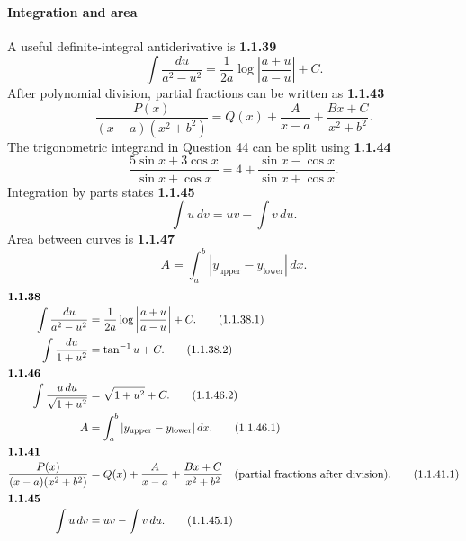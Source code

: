 \paragraph*{Integration and area}
A useful definite-integral antiderivative is
\noindent\textbf{1.1.39}\quad
\begin{equation}
\int\frac{du}{a^2-u^2}=\frac1{2a}\log\left|\frac{a+u}{a-u}\right|+C.\tag{1.1.39.1}\label{eq:int-rational-39}
\end{equation}
After polynomial division, partial fractions can be written as
\noindent\textbf{1.1.43}\quad
\begin{equation}
\frac{P(x)}{(x-a)(x^2+b^2)}=Q(x)+\frac{A}{x-a}+\frac{Bx+C}{x^2+b^2}.\tag{1.1.43.1}\label{eq:partial-fractions-43}
\end{equation}
The trigonometric integrand in Question 44 can be split using
\noindent\textbf{1.1.44}\quad
\begin{equation}
\frac{5\sin x+3\cos x}{\sin x+\cos x}=4+\frac{\sin x-\cos x}{\sin x+\cos x}.\tag{1.1.44.1}\label{eq:trig-split-44}
\end{equation}
Integration by parts states
\noindent\textbf{1.1.45}\quad
\begin{equation}
\int u\,dv=uv-\int v\,du.\tag{1.1.45.2}\label{eq:parts-45-2}
\end{equation}
Area between curves is
\noindent\textbf{1.1.47}\quad
\begin{equation}
A=\int_a^b|y_{\mathrm{upper}}-y_{\mathrm{lower}}|\,dx.\tag{1.1.47.1}\label{eq:area-between-47}
\end{equation}
\begin{align}\intertext{\textbf{1.1.38}}
\int\frac{du}{a^2-u^2}&=\frac1{2a}\log\left|\frac{a+u}{a-u}\right|+C. \tag{1.1.38.1}\label{eq:rational-integral-38}\\
\int\frac{du}{1+u^2}&=\tan^{-1}u+C. \tag{1.1.38.2}\label{eq:arctan-integral-38}\\
\intertext{\textbf{1.1.46}}
\int\frac{u\,du}{\sqrt{1+u^2}}&=\sqrt{1+u^2}+C. \tag{1.1.46.2}\\
A&=\int_a^b |y_{\mathrm{upper}}-y_{\mathrm{lower}}|\,dx. \tag{1.1.46.1}\\
\intertext{\textbf{1.1.41}}
\frac{P(x)}{(x-a)(x^2+b^2)}&=Q(x)+\frac{A}{x-a}+\frac{Bx+C}{x^2+b^2}\quad\text{(partial fractions after division)}. \tag{1.1.41.1}\\
\intertext{\textbf{1.1.45}}
\int u\,dv&=uv-\int v\,du. \tag{1.1.45.1}
\end{align}

